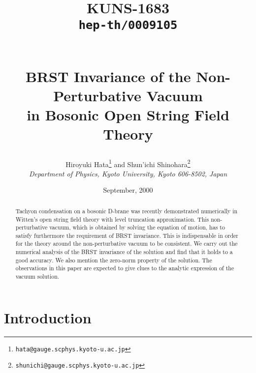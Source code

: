 \documentclass[a4paper,12pt]{article}
\begin{document}
\begin{titlepage}
\title{
\hfill\parbox{4cm}
{\normalsize KUNS-1683\\{\tt hep-th/0009105}}\\
\vspace{1cm}
BRST Invariance of the Non-Perturbative Vacuum\\[5pt]
in Bosonic Open String Field Theory
}
\author{
Hiroyuki {\sc Hata}\thanks{{\tt hata@gauge.scphys.kyoto-u.ac.jp}}
{}\hspace*{5pt} and \hspace*{5pt}
Shun'ichi {\sc Shinohara}\thanks{
{\tt shunichi@gauge.scphys.kyoto-u.ac.jp}}
\\[7pt]
{\it Department of Physics, Kyoto University, Kyoto 606-8502, Japan}
}
\date{\normalsize September, 2000}
\maketitle
\thispagestyle{empty}
\begin{abstract}
\normalsize\noindent
Tachyon condensation on a bosonic D-brane was recently demonstrated
numerically in Witten's open string field theory with level truncation
approximation.
This non-perturbative vacuum, which is obtained by solving the
equation of motion, has to satisfy furthermore the requirement of
BRST invariance. This is indispensable in order for the theory around
the non-perturbative vacuum to be consistent. We carry out the
numerical analysis of the BRST invariance of the solution and find
that it holds to a good accuracy.
We also mention the zero-norm property of the solution.
The observations in this paper are expected to give clues to the
analytic expression of the vacuum solution.

\end{abstract}

\end{titlepage}

\section{Introduction}
\end{document}
